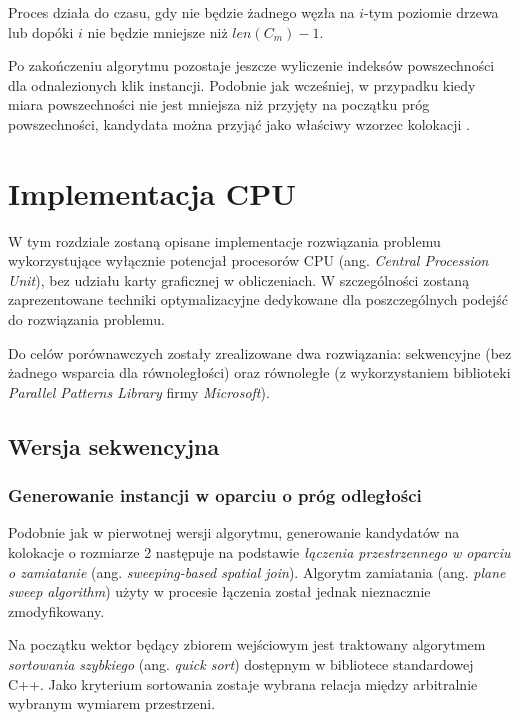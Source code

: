 \documentclass[12pt]{article}
\newcounter{algorytm}
\begin{document}
Proces działa do czasu, gdy nie będzie żadnego węzła na $ i $-tym poziomie drzewa lub dopóki $i$ nie będzie mniejsze niż $ len(C_{m}) - 1 $.

Po zakończeniu algorytmu pozostaje jeszcze wyliczenie indeksów powszechności dla odnalezionych klik instancji. Podobnie jak wcześniej, w przypadku kiedy miara powszechności nie jest mniejsza niż przyjęty na początku próg powszechności, kandydata można przyjąć jako właściwy wzorzec kolokacji \cite{huang}.

\newpage

\section{Implementacja CPU}
\label{sec:cpu}

W tym rozdziale zostaną opisane implementacje rozwiązania problemu \cite{chinczyki} wykorzystujące wyłącznie potencjał procesorów CPU (ang. \textit{Central Procession Unit}), bez udziału karty graficznej w obliczeniach. W szczególności zostaną zaprezentowane techniki optymalizacyjne dedykowane dla poszczególnych podejść do rozwiązania problemu. 

Do celów porównawczych zostały zrealizowane dwa rozwiązania: sekwencyjne (bez żadnego wsparcia dla równoległości) oraz równoległe (z wykorzystaniem biblioteki \textit{Parallel Patterns Library} firmy \textit{Microsoft}). 

\subsection{Wersja sekwencyjna}

\subsubsection{Generowanie instancji w oparciu o próg odległości}
\label{subsec:cpu-step-1}

Podobnie jak w pierwotnej wersji algorytmu, generowanie kandydatów na kolokacje o rozmiarze 2 następuje na podstawie \textit{łączenia przestrzennego w oparciu o zamiatanie} (ang. \textit{sweeping-based spatial join}). Algorytm zamiatania (ang. \textit{plane sweep algorithm}) użyty w procesie łączenia został jednak nieznacznie zmodyfikowany.

Na początku wektor będący zbiorem wejściowym jest traktowany algorytmem \textit{sortowania szybkiego} (ang. \textit{quick sort}) dostępnym w bibliotece standardowej C++. Jako kryterium sortowania zostaje wybrana relacja między arbitralnie wybranym wymiarem przestrzeni.
\end{document}
